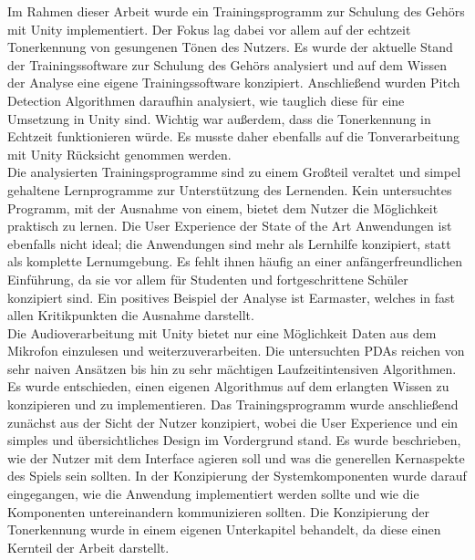 Im Rahmen dieser Arbeit wurde ein Trainingsprogramm zur Schulung des Gehörs mit Unity implementiert. Der Fokus lag dabei vor allem auf der echtzeit Tonerkennung von gesungenen Tönen des Nutzers. Es wurde der aktuelle Stand der Trainingssoftware zur Schulung des Gehörs analysiert und auf dem Wissen der Analyse eine eigene Trainingssoftware konzipiert. Anschließend wurden Pitch Detection Algorithmen daraufhin analysiert, wie tauglich diese für eine Umsetzung in Unity sind. Wichtig war außerdem, dass die Tonerkennung in Echtzeit funktionieren würde. Es musste daher ebenfalls auf die Tonverarbeitung mit Unity Rücksicht genommen werden. \\
Die analysierten Trainingsprogramme sind zu einem Großteil veraltet und simpel gehaltene Lernprogramme zur Unterstützung des Lernenden. Kein untersuchtes Programm, mit der Ausnahme von einem, bietet dem Nutzer die Möglichkeit praktisch zu lernen. Die User Experience der State of the Art Anwendungen ist ebenfalls nicht ideal; die Anwendungen sind mehr als Lernhilfe konzipiert, statt als komplette Lernumgebung. Es fehlt ihnen häufig an einer anfängerfreundlichen Einführung, da sie vor allem für Studenten und fortgeschrittene Schüler konzipiert sind. Ein positives Beispiel der Analyse ist Earmaster, welches in fast allen Kritikpunkten die Ausnahme darstellt. \\
Die Audioverarbeitung mit Unity bietet nur eine Möglichkeit Daten aus dem Mikrofon einzulesen und weiterzuverarbeiten. Die untersuchten PDAs reichen von sehr naiven Ansätzen bis hin zu sehr mächtigen Laufzeitintensiven Algorithmen. Es wurde entschieden, einen eigenen Algorithmus auf dem erlangten Wissen zu konzipieren und zu implementieren. Das Trainingsprogramm wurde anschließend zunächst aus der Sicht der Nutzer konzipiert, wobei die User Experience und ein simples und übersichtliches Design im Vordergrund stand. Es wurde beschrieben, wie der Nutzer mit dem Interface agieren soll und was die generellen Kernaspekte des Spiels sein sollten. In der Konzipierung der Systemkomponenten wurde darauf eingegangen, wie die Anwendung implementiert werden sollte und wie die Komponenten untereinandern kommunizieren sollten. Die Konzipierung der Tonerkennung wurde in einem eigenen Unterkapitel behandelt, da diese einen Kernteil der Arbeit darstellt. \\

